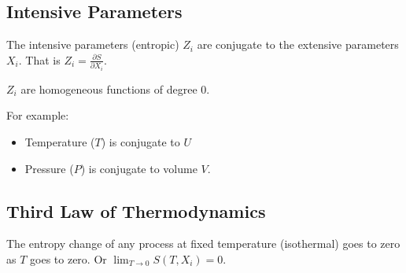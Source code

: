 \subsection{Intensive Parameters}

The intensive parameters (entropic) $Z_i$ are conjugate to the extensive parameters $X_i$. That is $Z_i = \frac{\partial S}{\partial X_i}$.

$Z_i$ are homogeneous functions of degree 0. 

For example:

\begin{itemize}

\item Temperature ($T$) is conjugate to $U$
\item Pressure ($P$) is conjugate to volume $V$.

\end{itemize}

\subsection{Third Law of Thermodynamics}

The entropy change of any process at fixed temperature (isothermal) goes to zero as $T$ goes to zero. Or $\lim_{T \rightarrow 0} S(T, X_i) = 0$.